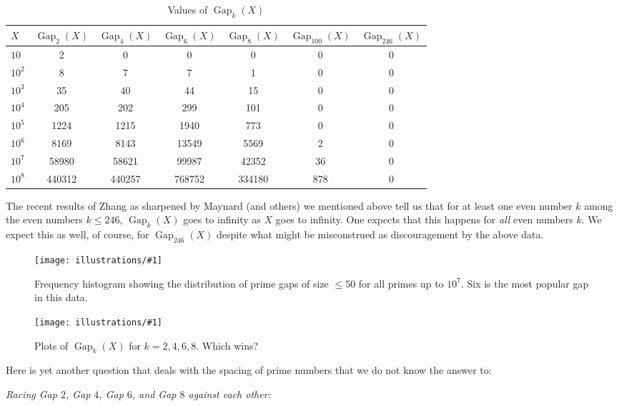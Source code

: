 \documentclass[openany]{book}
\DeclareMathOperator{\Gap}{Gap}
\newcommand{\ill}[3]{%
   \begin{figure}[H]%
   \vspace{-2ex}
   \centering%
   \texttt{[image: illustrations/\#1]}%
   \caption{#3}%
   \vspace{-2ex}
    \end{figure}}
\theoremstyle{plain}
\theoremstyle{definition}
\begin{document}
\begin{table}[H]\centering
\caption{Values of $\Gap_{k}(X)$ \label{tab:gap}}
\vspace{1em}

{\small
\begin{tabular}{|l|c|c|c|c|c|c|}\hline
$X$ & $\Gap_{2}(X)$ & $\Gap_{4}(X)$& $\Gap_{6}(X)$ & $\Gap_{8}(X)$ &
 $\Gap_{100}(X)$ &   $\Gap_{246}(X)$\\\hline

$10$ & 2 & 0 & 0 & 0 & 0 & 0\\\hline
$10^{2}$ & 8 & 7 & 7 & 1 & 0 & 0\\\hline
$10^{3}$ & 35 & 40 & 44 & 15 & 0 & 0\\\hline
$10^{4}$ & 205 & 202 & 299 & 101 & 0 & 0\\\hline
$10^{5}$ & 1224 & 1215 & 1940 & 773 & 0 & 0\\\hline
$10^{6}$ & 8169 & 8143 & 13549 & 5569 & 2 & 0\\\hline
$10^{7}$ & 58980 & 58621 & 99987 & 42352 & 36 & 0\\\hline
$10^{8}$ & 440312 & 440257 & 768752 & 334180 & 878 & 0\\\hline

\end{tabular}
}
\end{table}

 The recent results of Zhang as sharpened by Maynard (and others) we mentioned above tell us that for  at least one even number $k$ among the  even numbers $k \le 246$,    $\Gap_{k}(X)$ goes to infinity as $X$ goes to infinity. One expects that this happens for {\it all} even numbers $k$. We expect this as well, of course, for $\Gap_{246}(X)$ despite what might be misconstrued as discouragement by the above data.

\ill{primegapdist}{1}{Frequency histogram showing the distribution of
  prime gaps of size $\leq 50$ for all primes up to $10^7$.  Six is
  the most popular gap in this data.
\label{fig:primegapdist}}


\ill{primegap_race}{1}{Plots of $\Gap_k(X)$ for $k=2,4,6,8$.  Which wins?}

Here is yet another question that deals with the spacing of prime
numbers that we do not know the answer to:

{\em Racing Gap $2$,  Gap $4$, Gap $6$, and Gap $8$ against each other:}
\end{document}

